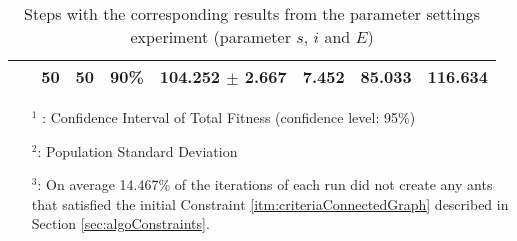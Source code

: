 \begin{table}
\begin{tabular}{|l|l|l|c||c|c|c|c|}
    ~ & 50 & 50 & \textbf{90\%} & 104.252 $\pm$ 2.667 & 7.452 & 85.033 & 116.634\\
    \hline
    \end{tabular}
    \caption {Steps with the corresponding results from the parameter settings experiment (parameter $s$, $i$ and $E$)}
    \tiny
    \begin{itemize}[noitemsep]
    \item[$^1$ :] Confidence Interval of Total Fitness (confidence level: 95\%)
    \item[$^2$:] Population Standard Deviation 
    \item[$^3$:] On average 14.467\% of the iterations of each run did not create any ants that satisfied the initial Constraint \ref{itm:criteriaConnectedGraph} described in Section \vref{sec:algoConstraints}.
    \end{itemize}
    \label{table:pm1}
\end{table}

